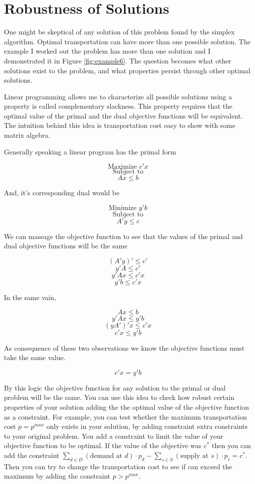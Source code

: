 \documentclass{report}
\begin{document}
\section{Robustness of Solutions}

One might be skeptical of any solution of this problem found by the simplex algorithm. Optimal transportation can have more than one possible solution. The example I worked out the problem has more than one solution and I demonstrated it in Figure \ref{fig:example6}. The question becomes what other solutions exist to the problem, and what properties persist through other optimal solutions. 

Linear programming allows me to characterize all possible solutions using a property is called complementary slackness. This property requires that the optimal value of the primal and the dual objective functions will be equivalent. The intuition behind this idea is transportation cost easy to show with some matrix algebra.

Generally speaking a linear program has the primal form

$$\text{Maximize } c' x$$
$$\text{Subject to}$$
$$Ax \leq b$$

And, it's corresponding dual would be

$$\text{Minimize } y' b$$
$$\text{Subject to}$$
$$A'y \leq c$$

We can massage the objective function to see that the values of the primal and dual objective functions will be the same

$$(A'y)' \leq c'$$
$$ y'A \leq c'$$
$$ y'Ax \leq c'x$$
$$y' b \leq c'x$$

In the same vain, 

$$ Ax \leq b$$
$$ y'Ax \leq y'b$$
$$ (yA')'x \leq c'x$$
$$ c'x \leq  y' b $$

As consequence of these two observations we know the objective functions must take the same value.

$$c'x = y' b$$

By this logic the objective function for any solution to the primal or dual problem will be the same. You can use this idea to check how robust certain properties of your solution adding the the optimal value of the objective function as a constraint. For example, you can test whether the maximum transportation cost $p = p^{max}$ only exists in your solution, by adding constraint extra constraints to your original problem. You add a constraint to limit the value of your objective function to be optimal. If the value of the objective was $c^*$ then you can add the constraint  $ \sum_{d \in D}  (\text{demand at } d) \cdot p_{d} -   \sum_{s \in S}  (\text{supply at } s) \cdot p_{s} = c^*$. Then you can try to change the transportation cost to see if can exceed the maximum by adding the constraint $p > p^{max}$.
\end{document}
